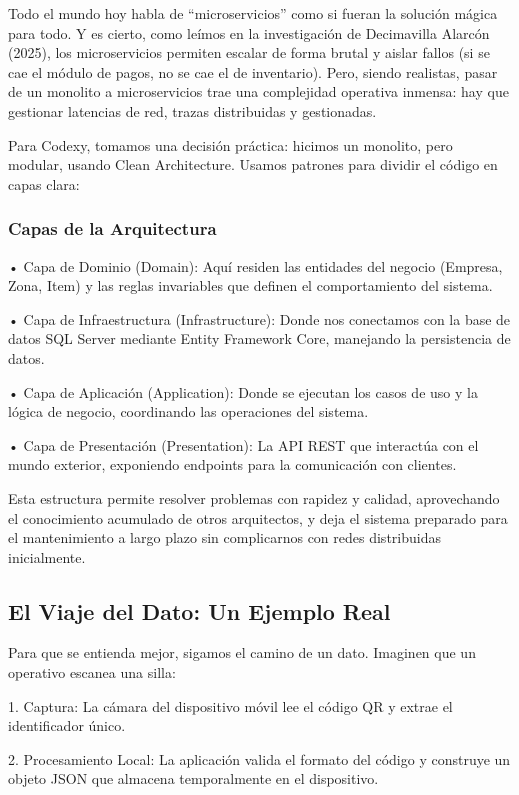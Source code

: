 Todo el mundo hoy habla de ``microservicios'' como si fueran la solución mágica para todo. Y es cierto, como leímos en la investigación de Decimavilla Alarcón (2025), los microservicios permiten escalar de forma brutal y aislar fallos (si se cae el módulo de pagos, no se cae el de inventario). Pero, siendo realistas, pasar de un monolito a microservicios trae una complejidad operativa inmensa: hay que gestionar latencias de red, trazas distribuidas y gestionadas.

Para Codexy, tomamos una decisión práctica: hicimos un monolito, pero modular, usando Clean Architecture. Usamos patrones para dividir el código en capas clara:

\subsubsection{Capas de la Arquitectura}
• Capa de Dominio (Domain): Aquí residen las entidades del negocio (Empresa, Zona, Item) y las reglas invariables que definen el comportamiento del sistema.

• Capa de Infraestructura (Infrastructure): Donde nos conectamos con la base de datos SQL Server mediante Entity Framework Core, manejando la persistencia de datos.

• Capa de Aplicación (Application): Donde se ejecutan los casos de uso y la lógica de negocio, coordinando las operaciones del sistema.

• Capa de Presentación (Presentation): La API REST que interactúa con el mundo exterior, exponiendo endpoints para la comunicación con clientes.

Esta estructura permite resolver problemas con rapidez y calidad, aprovechando el conocimiento acumulado de otros arquitectos, y deja el sistema preparado para el mantenimiento a largo plazo sin complicarnos con redes distribuidas inicialmente.

\subsection{El Viaje del Dato: Un Ejemplo Real}
Para que se entienda mejor, sigamos el camino de un dato. Imaginen que un operativo escanea una silla:

1. Captura: La cámara del dispositivo móvil lee el código QR y extrae el identificador único.

2. Procesamiento Local: La aplicación valida el formato del código y construye un objeto JSON que almacena temporalmente en el dispositivo.

